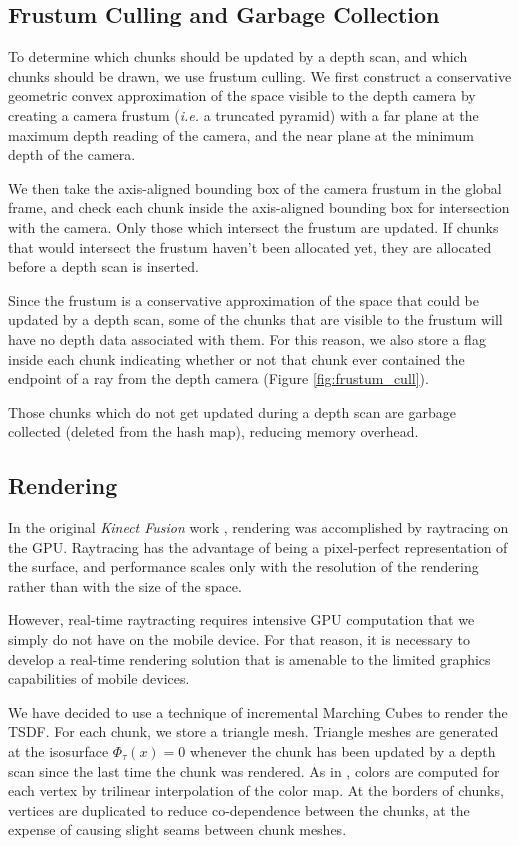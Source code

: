 \documentclass[10pt,twocolumn,letterpaper]{article}
\begin{document}
\subsection{Frustum Culling and Garbage Collection}
To determine which chunks should be updated by a depth scan, and which chunks
should be drawn, we use frustum culling. We first construct a conservative
geometric convex approximation of the space visible to the depth camera by
creating a camera frustum (\textit{i.e.} a truncated pyramid) with a far plane
at the maximum depth reading of the camera, and the near plane at the minimum
depth of the camera. 

We then take the axis-aligned bounding box of the camera frustum in the global
frame, and check each chunk inside the axis-aligned bounding box for 
intersection with the camera. Only those which intersect the frustum are
updated. If chunks that would intersect the frustum haven't been allocated yet,
they are allocated before a depth scan is inserted.

Since the frustum is a conservative approximation of the space that could be
updated by a depth scan, some of the chunks that are visible to the frustum will
have no depth data associated with them. For this reason, we also store a flag
inside each chunk indicating whether or not that chunk ever contained the
endpoint of a ray from the depth camera (Figure \ref{fig:frustum_cull}).

Those chunks which do not get updated during a depth scan are garbage collected
(deleted from the hash map), reducing memory overhead.

\subsection{Rendering}
In the original \textit{Kinect Fusion} work \cite{Newcombe}, rendering was
accomplished by raytracing on the GPU. Raytracing has the advantage of being a
pixel-perfect representation of the surface, and performance scales only with
the resolution of the rendering rather than with the size of the space. 

However, real-time raytracting requires intensive GPU computation that we simply
do not have on the mobile device. For that reason, it is necessary to develop a
real-time rendering solution that is amenable to the limited graphics
capabilities of mobile devices.

We have decided to use a technique of incremental Marching Cubes
\cite{Lorensen1987} to render the TSDF. For each chunk, we store a triangle
mesh. Triangle meshes are generated at the isosurface $\Phi_{\tau}(x) = 0$
whenever the chunk has been updated by a depth scan since the last time the
chunk was rendered. As in \cite{Bylow2013, Whelan2013},  colors are computed for
each vertex by trilinear interpolation of the color map. At the borders of chunks, vertices are
duplicated to reduce co-dependence between the chunks, at the expense of
causing slight seams between chunk meshes.
\end{document}
